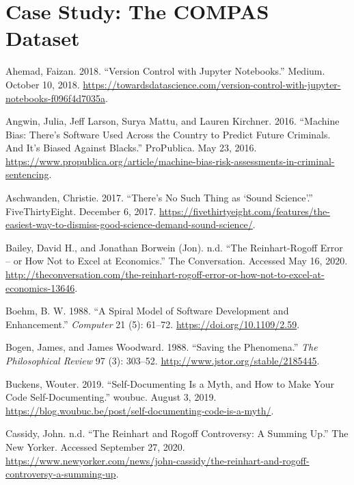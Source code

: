 \documentclass[
]{article}
\newlength{\cslhangindent}
\newenvironment{cslreferences}%
  {\setlength{\parindent}{0pt}%
  \everypar{\setlength{\hangindent}{\cslhangindent}}\ignorespaces}%
  {\par}
\begin{document}
\hypertarget{part-case-study-the-compas-dataset}{%
\part{Case Study: The COMPAS Dataset}\label{part-case-study-the-compas-dataset}}

\hypertarget{refs}{}
\begin{cslreferences}
\leavevmode\hypertarget{ref-AhemadVersionControlJupyter2018}{}%
Ahemad, Faizan. 2018. ``Version Control with Jupyter Notebooks.'' Medium. October 10, 2018. \url{https://towardsdatascience.com/version-control-with-jupyter-notebooks-f096f4d7035a}.

\leavevmode\hypertarget{ref-AngwinMachineBiasThere2016}{}%
Angwin, Julia, Jeff Larson, Surya Mattu, and Lauren Kirchner. 2016. ``Machine Bias: There's Software Used Across the Country to Predict Future Criminals. And It's Biased Against Blacks.'' ProPublica. May 23, 2016. \url{https://www.propublica.org/article/machine-bias-risk-assessments-in-criminal-sentencing}.

\leavevmode\hypertarget{ref-AschwandenThereNoSuch2017}{}%
Aschwanden, Christie. 2017. ``There's No Such Thing as `Sound Science'.'' FiveThirtyEight. December 6, 2017. \url{https://fivethirtyeight.com/features/the-easiest-way-to-dismiss-good-science-demand-sound-science/}.

\leavevmode\hypertarget{ref-BaileyReinhartRogoffErrorHow}{}%
Bailey, David H., and Jonathan Borwein (Jon). n.d. ``The Reinhart-Rogoff Error -- or How Not to Excel at Economics.'' The Conversation. Accessed May 16, 2020. \url{http://theconversation.com/the-reinhart-rogoff-error-or-how-not-to-excel-at-economics-13646}.

\leavevmode\hypertarget{ref-BoehmSpiralModelSoftware1988}{}%
Boehm, B. W. 1988. ``A Spiral Model of Software Development and Enhancement.'' \emph{Computer} 21 (5): 61--72. \url{https://doi.org/10.1109/2.59}.

\leavevmode\hypertarget{ref-BogenSavingPhenomena1988}{}%
Bogen, James, and James Woodward. 1988. ``Saving the Phenomena.'' \emph{The Philosophical Review} 97 (3): 303--52. \url{http://www.jstor.org/stable/2185445}.

\leavevmode\hypertarget{ref-BuckensSelfdocumentingMythHow2019}{}%
Buckens, Wouter. 2019. ``Self-Documenting Is a Myth, and How to Make Your Code Self-Documenting.'' woubuc. August 3, 2019. \url{https://blog.woubuc.be/post/self-documenting-code-is-a-myth/}.

\leavevmode\hypertarget{ref-CassidyReinhartRogoffControversy}{}%
Cassidy, John. n.d. ``The Reinhart and Rogoff Controversy: A Summing Up.'' The New Yorker. Accessed September 27, 2020. \url{https://www.newyorker.com/news/john-cassidy/the-reinhart-and-rogoff-controversy-a-summing-up}.


\end{cslreferences}
\end{document}
